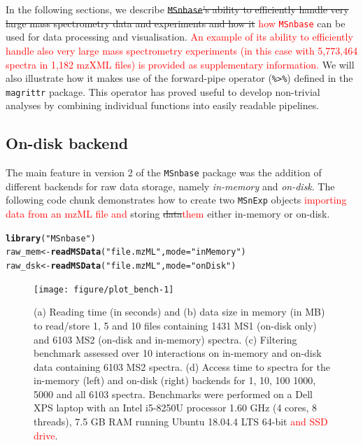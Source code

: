 \documentclass[journal=jacsat,manuscript=article]{achemso}\usepackage[]{graphicx}\usepackage[]{color}
\makeatletter
\newcommand{\hlstr}[1]{\textcolor[rgb]{0.192,0.494,0.8}{#1}}%
\newcommand{\hlstd}[1]{\textcolor[rgb]{0.345,0.345,0.345}{#1}}%
\newcommand{\hlkwb}[1]{\textcolor[rgb]{0.69,0.353,0.396}{#1}}%
\newcommand{\hlkwc}[1]{\textcolor[rgb]{0.333,0.667,0.333}{#1}}%
\newcommand{\hlkwd}[1]{\textcolor[rgb]{0.737,0.353,0.396}{\textbf{#1}}}%
\newenvironment{kframe}{%
 \def\at@end@of@kframe{}%
 \ifinner\ifhmode%
  \def\at@end@of@kframe{\end{minipage}}%
  \begin{minipage}{\columnwidth}%
 \fi\fi%
 \def\FrameCommand##1{\hskip\@totalleftmargin \hskip-\fboxsep
 \colorbox{shadecolor}{##1}\hskip-\fboxsep
     \hskip-\linewidth \hskip-\@totalleftmargin \hskip\columnwidth}%
 \MakeFramed {\advance\hsize-\width
   \@totalleftmargin\z@ \linewidth\hsize
   \@setminipage}}%
 {\par\unskip\endMakeFramed%
 \at@end@of@kframe}
\newenvironment{knitrout}{}{} %
\makeatother
\begin{document}
In the following sections, we describe \sout{\texttt{MSnbase}'s
  ability to efficiently handle very large mass spectrometry data and
  experiments and how it} \textcolor{red}{how \texttt{MSnbase}} can be
used for data processing and visualisation. \textcolor{red}{An example
  of its ability to efficiently handle also very large mass
  spectrometry experiments (in this case with 5,773,464 spectra in
  1,182 mzXML files) is provided as supplementary information.}  We
will also illustrate how it makes use of the forward-pipe operator
(\texttt{\%>\%}) defined in the \texttt{magrittr} package. This
operator has proved useful to develop non-trivial analyses by
combining individual functions into easily readable pipelines.


\subsection{On-disk backend}

The main feature in version 2 of the \texttt{MSnbase} package was the
addition of different backends for raw data storage, namely
\textit{in-memory} and \textit{on-disk}. The following code chunk
demonstrates how to create two \texttt{MSnExp} objects \textcolor{red}{importing
  data from an mzML file and} storing \sout{data}\textcolor{red}{them}
either in-memory or on-disk.

\begin{knitrout}
\color{fgcolor}\begin{kframe}
\begin{alltt}
\hlkwd{library}\hlstd{(}\hlstr{"MSnbase"}\hlstd{)}
\hlstd{raw_mem} \hlkwb{<-} \hlkwd{readMSData}\hlstd{(}\hlstr{"file.mzML"}\hlstd{,} \hlkwc{mode} \hlstd{=} \hlstr{"inMemory"}\hlstd{)}
\hlstd{raw_dsk} \hlkwb{<-} \hlkwd{readMSData}\hlstd{(}\hlstr{"file.mzML"}\hlstd{,} \hlkwc{mode} \hlstd{=} \hlstr{"onDisk"}\hlstd{)}
\end{alltt}
\end{kframe}
\end{knitrout}







\begin{figure}[p]
  \centering
\begin{knitrout}
\color{fgcolor}
\texttt{[image: figure/plot\_bench-1]} 

\end{knitrout}
\caption{(a) Reading time (in seconds) and (b) data size in memory (in
  MB) to read/store 1, 5 and 10 files containing 1431 MS1 (on-disk
  only) and 6103 MS2 (on-disk and in-memory) spectra. (c) Filtering
  benchmark assessed over 10 interactions on in-memory and on-disk
  data containing 6103 MS2 spectra.  (d) Access time to spectra for
  the in-memory (left) and on-disk (right) backends for 1, 10, 100
  1000, 5000 and all 6103 spectra. Benchmarks were performed on a Dell
  XPS laptop with an Intel i5-8250U processor 1.60 GHz (4 cores, 8
  threads), 7.5 GB RAM running Ubuntu 18.04.4 LTS 64-bit
  \textcolor{red}{and SSD drive}. }
\label{fig:bench}
\end{figure}
\end{document}
